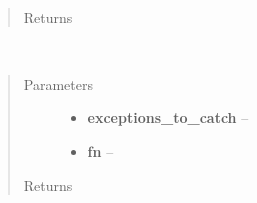 \documentclass[letterpaper,10pt,english]{sphinxmanual}
\begin{document}

\begin{fulllineitems}
\label{index:aietes.Tools.timestamp}~\begin{quote}\begin{description}
\item[{Returns}] \leavevmode


\end{description}\end{quote}

\end{fulllineitems}


\begin{fulllineitems}
\label{index:aietes.Tools.try_forever}~\begin{quote}\begin{description}
\item[{Parameters}] \leavevmode\begin{itemize}
\item {} 
\textbf{exceptions\_to\_catch} -- 

\item {} 
\textbf{fn} -- 

\end{itemize}

\item[{Returns}] \leavevmode


\end{description}\end{quote}

\end{fulllineitems}

\end{document}
